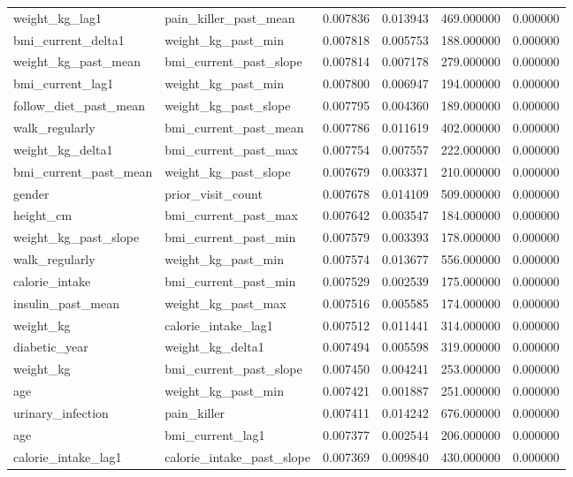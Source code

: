 \begin{longtable}{llrrrr}
weight\_kg\_lag1 & pain\_killer\_past\_mean & 0.007836 & 0.013943 & 469.000000 & 0.000000 \\
bmi\_current\_delta1 & weight\_kg\_past\_min & 0.007818 & 0.005753 & 188.000000 & 0.000000 \\
weight\_kg\_past\_mean & bmi\_current\_past\_slope & 0.007814 & 0.007178 & 279.000000 & 0.000000 \\
bmi\_current\_lag1 & weight\_kg\_past\_min & 0.007800 & 0.006947 & 194.000000 & 0.000000 \\
follow\_diet\_past\_mean & weight\_kg\_past\_slope & 0.007795 & 0.004360 & 189.000000 & 0.000000 \\
walk\_regularly & bmi\_current\_past\_mean & 0.007786 & 0.011619 & 402.000000 & 0.000000 \\
weight\_kg\_delta1 & bmi\_current\_past\_max & 0.007754 & 0.007557 & 222.000000 & 0.000000 \\
bmi\_current\_past\_mean & weight\_kg\_past\_slope & 0.007679 & 0.003371 & 210.000000 & 0.000000 \\
gender & prior\_visit\_count & 0.007678 & 0.014109 & 509.000000 & 0.000000 \\
height\_cm & bmi\_current\_past\_max & 0.007642 & 0.003547 & 184.000000 & 0.000000 \\
weight\_kg\_past\_slope & bmi\_current\_past\_min & 0.007579 & 0.003393 & 178.000000 & 0.000000 \\
walk\_regularly & weight\_kg\_past\_min & 0.007574 & 0.013677 & 556.000000 & 0.000000 \\
calorie\_intake & bmi\_current\_past\_min & 0.007529 & 0.002539 & 175.000000 & 0.000000 \\
insulin\_past\_mean & weight\_kg\_past\_max & 0.007516 & 0.005585 & 174.000000 & 0.000000 \\
weight\_kg & calorie\_intake\_lag1 & 0.007512 & 0.011441 & 314.000000 & 0.000000 \\
diabetic\_year & weight\_kg\_delta1 & 0.007494 & 0.005598 & 319.000000 & 0.000000 \\
weight\_kg & bmi\_current\_past\_slope & 0.007450 & 0.004241 & 253.000000 & 0.000000 \\
age & weight\_kg\_past\_min & 0.007421 & 0.001887 & 251.000000 & 0.000000 \\
urinary\_infection & pain\_killer & 0.007411 & 0.014242 & 676.000000 & 0.000000 \\
age & bmi\_current\_lag1 & 0.007377 & 0.002544 & 206.000000 & 0.000000 \\
calorie\_intake\_lag1 & calorie\_intake\_past\_slope & 0.007369 & 0.009840 & 430.000000 & 0.000000 \\

\end{longtable}
